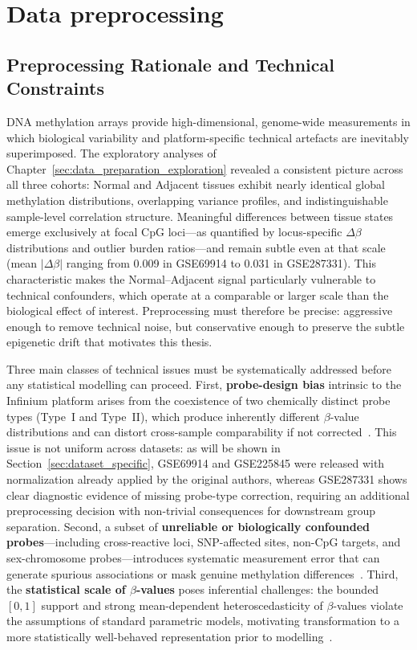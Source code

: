 \chapter{Data preprocessing}
\label{chap:data_preprocessing}

\section{Preprocessing Rationale and Technical Constraints}
\label{sec:preprocessing_rationale}
DNA methylation arrays provide high-dimensional, genome-wide measurements 
in which biological variability and platform-specific technical artefacts 
are inevitably superimposed. The exploratory analyses of Chapter~\ref{sec:data_preparation_exploration} 
revealed a consistent picture across all three cohorts: Normal and Adjacent 
tissues exhibit nearly identical global methylation distributions, 
overlapping variance profiles, and indistinguishable sample-level 
correlation structure. Meaningful differences between tissue states emerge 
exclusively at focal CpG loci—as quantified by locus-specific $\Delta\beta$ 
distributions and outlier burden ratios—and remain subtle even at that 
scale (mean $|\Delta\beta|$ ranging from 0.009 in GSE69914 to 0.031 in 
GSE287331). This characteristic makes the Normal--Adjacent signal 
particularly vulnerable to technical confounders, which operate at a 
comparable or larger scale than the biological effect of interest. 
Preprocessing must therefore be precise: aggressive enough to remove 
technical noise, but conservative enough to preserve the subtle epigenetic 
drift that motivates this thesis.

Three main classes of technical issues must be systematically addressed 
before any statistical modelling can proceed. First, \textbf{probe-design 
bias} intrinsic to the Infinium platform arises from the coexistence of 
two chemically distinct probe types (Type~I and Type~II), which produce 
inherently different $\beta$-value distributions and can distort 
cross-sample comparability if not corrected~\cite{Triche2013, Fortin2017}. 
This issue is not uniform across datasets: as will be shown in 
Section~\ref{sec:dataset_specific}, GSE69914 and GSE225845 were released 
with normalization already applied by the original authors, whereas 
GSE287331 shows clear diagnostic evidence of missing probe-type correction, 
requiring an additional preprocessing decision with non-trivial consequences 
for downstream group separation. Second, a subset of \textbf{unreliable 
or biologically confounded probes}---including cross-reactive loci, 
SNP-affected sites, non-CpG targets, and sex-chromosome probes---introduces 
systematic measurement error that can generate spurious associations or 
mask genuine methylation differences~\cite{WilhelmBenartzi2013, Xu2021}. 
Third, the \textbf{statistical scale of $\beta$-values} poses inferential 
challenges: the bounded $[0,1]$ support and strong mean-dependent 
heteroscedasticity of $\beta$-values violate the assumptions of standard 
parametric models, motivating transformation to a more statistically 
well-behaved representation prior to modelling~\cite{Triche2013}.

